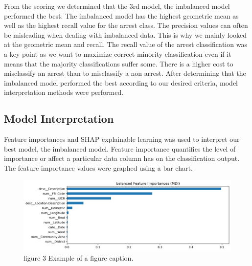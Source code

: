 \documentclass[conference]{IEEEtran}
\begin{document}
From the scoring we determined that the 3rd model, the imbalanced model performed the best. The imbalanced model has the highest geometric mean as well as the highest recall value for the arrest class. The precision values can often be misleading when dealing with imbalanced data. This is why we mainly looked at the geometric mean and recall. The recall value of the arrest classification was a key point as we want to maximize correct minority classification even if it means that the majority classifications suffer some. There is a higher cost to misclassify an arrest than to misclassify a non arrest. After determining that the imbalanced model performed the best according to our desired criteria, model interpretation methods were performed.

\subsection{Model Interpretation}
Feature importances and SHAP explainable learning was used to interpret our best model, the imbalanced model. Feature importance quantifies the level of importance or affect a particular data column has on the classification output. The feature importance values were graphed using a bar chart.
\begin{figure}[htbp]
	\centerline{\includegraphics{Graphs/balanced_feature_importance.jpg}}
	\caption{figure 3 Example of a figure caption.}
	\label{balanced_feature_importance}
\end{figure}
\end{document}
